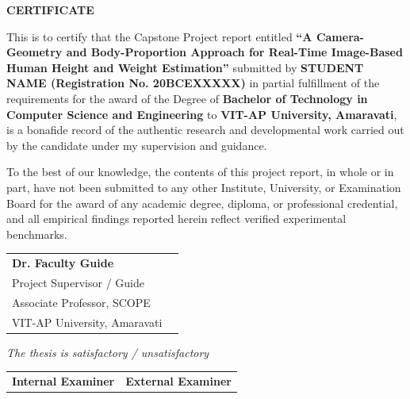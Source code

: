 \documentclass[12pt,a4paper,oneside]{report}
\begin{document}
\setcounter{page}{2}

\clearpage
\begin{center}
{\Large\bfseries CERTIFICATE\par}
\end{center}
\vspace{0.6cm}

\noindent This is to certify that the Capstone Project report entitled \textbf{``A Camera-Geometry and Body-Proportion Approach for Real-Time Image-Based Human Height and Weight Estimation''} submitted by \textbf{STUDENT NAME (Registration No. 20BCEXXXXX)} in partial fulfillment of the requirements for the award of the Degree of \textbf{Bachelor of Technology in Computer Science and Engineering} to \textbf{VIT-AP University, Amaravati}, is a bonafide record of the authentic research and developmental work carried out by the candidate under my supervision and guidance. 

\noindent To the best of our knowledge, the contents of this project report, in whole or in part, have not been submitted to any other Institute, University, or Examination Board for the award of any academic degree, diploma, or professional credential, and all empirical findings reported herein reflect verified experimental benchmarks.

\vspace{1.4cm}

\noindent\begin{tabular}{@{}p{}p{}@{}}
\textbf{Dr. Faculty Guide} & \\
Project Supervisor / Guide & \\
Associate Professor, SCOPE & \\
VIT-AP University, Amaravati & \\
\end{tabular}

\vspace{1.0cm}
\begin{center}
\textit{The thesis is satisfactory / unsatisfactory}
\end{center}

\vspace{1.2cm}
\noindent\begin{tabular}{@{}p{}p{}@{}}
\textbf{Internal Examiner} & \textbf{External Examiner} \\
\end{tabular}
\end{document}
